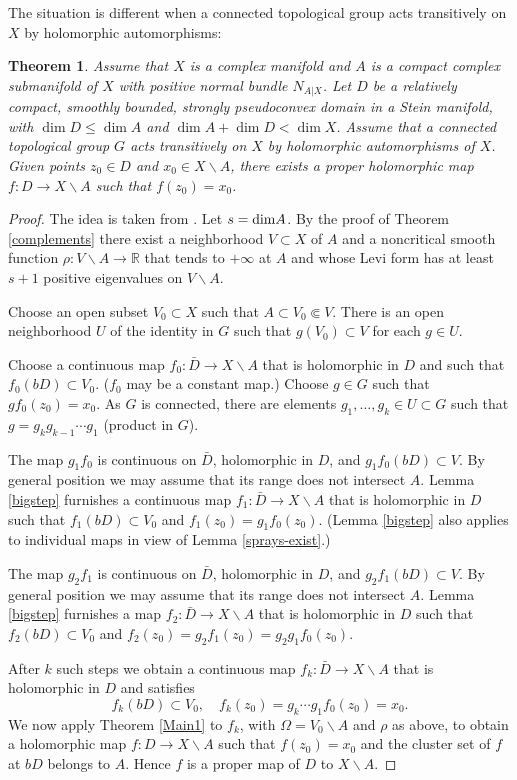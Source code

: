 \documentclass[11pt]{amsart}
\numberwithin{equation}{section}
\newtheorem{theorem}{Theorem}[section]
\theoremstyle{definition}
\begin{document}
The situation is different when a connected topological group acts
transitively on $X$ by holomorphic automorphisms:

\begin{theorem}
\label{homogeneous}
Assume that $X$ is a complex manifold and $A$  
is a compact complex submanifold of $X$ with positive normal bundle 
$N_{A|X}$. Let $D$ be a relatively compact, smoothly bounded, 
strongly pseudoconvex domain in a Stein manifold, 
with $\dim D \le \dim A$ and $\dim A + \dim D < \dim X$.
Assume that a connected topological group $G$ acts transitively 
on $X$ by holomorphic automorphisms of $X$.
Given points $z_0\in D$ and $x_0\in X{\backslash} A$, 
there exists a proper holomorphic map $f\colon D \to X{\backslash} A$ 
such that $f(z_0)=x_0$.
\end{theorem}

\begin{proof}
The idea is taken from \cite[proof of Theorem 1]{FGl}. 
Let $s={\rm dim}A$. By the proof of Theorem \ref{complements} there 
exist a neighborhood $V\subset X$ of $A$ and a noncritical smooth
function $\rho\colon V{\backslash} A \to {\mathbb{R}}$ that tends to $+\infty$ 
at $A$ and whose Levi form has at least $s+1$ positive eigenvalues 
on $V{\backslash} A$.

Choose an open subset $V_0\subset X$ such that $A\subset V_0\Subset V$.
There is an open neighborhood $U$ of the identity in $G$ such that 
$g(V_0) \subset V$ for each $g\in U$. 

Choose a continuous map $f_0\colon \bar D\to X{\backslash} A$ 
that is holomorphic in $D$ and such that $f_0(bD)\subset V_0$.
($f_0$ may be a constant map.) Choose $g\in G$ such that
$g f_0(z_0)=x_0$. As $G$ is connected, there are elements 
$g_1,\ldots,g_k\in U \subset G$ such that 
$g=g_k g_{k-1}\cdots g_1$ (product in $G$). 

The map $g_1 f_0$ is continuous on $\bar D$, holomorphic in $D$, 
and $g_1 f_0(bD)\subset V$. By general position we may assume
that its range does not intersect $A$.
Lemma \ref{bigstep} furnishes a continuous map $f_1\colon \bar D\to X{\backslash} A$ 
that is holomorphic in $D$ such that $f_1(bD)\subset V_0$ and
$f_1(z_0)=g_1 f_0(z_0)$. (Lemma \ref{bigstep} also 
applies to individual maps in view of Lemma \ref{sprays-exist}.)

The map $g_2 f_1$ is continuous on $\bar D$, holomorphic in $D$, 
and $g_2 f_1(bD)\subset V$. By general position we 
may assume that its range does not intersect $A$. Lemma \ref{bigstep} furnishes 
a map $f_2\colon \bar D\to X{\backslash} A$ that is holomorphic in $D$ 
such that $f_2(bD)\subset V_0$ and $f_2(z_0)=g_2 f_1(z_0)= g_2 g_1 f_0(z_0)$.

After $k$ such steps we obtain a continuous map 
$f_k\colon \bar D\to X{\backslash} A$ that is holomorphic in $D$ and satisfies   
\[
	f_k(bD)\subset V_0,\quad 
	f_k(z_0)=g_k\cdots g_1 f_0(z_0)=x_0. 
\]
We now apply Theorem \ref{Main1} to $f_k$, with $\Omega= V_0{\backslash} A$ 
and $\rho$ as above, 
to obtain a holomorphic map $f \colon D\to X{\backslash} A$ 
such that $f(z_0)=x_0$ and the cluster set of $f$ at $bD$
belongs to $A$. Hence $f$ is a proper map of $D$ to $X{\backslash} A$.  
\end{proof}
 
\end{document}
